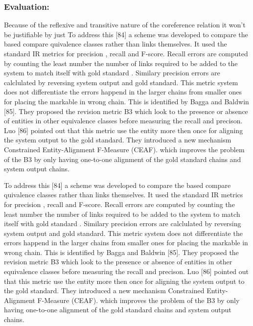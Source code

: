 \documentclass[11pt]{article}
\begin{document}
\subsubsection{Evaluation:}
Because of the reflexive and transitive nature of the coreference relation it won't be justifiable by just
To address this [84] a scheme was developed to compare the  based compare quivalence classes rather than links themselves. It used the standard IR metrics for precision , recall and  F-score. Recall errors are computed by counting the least number the number of links required to be added to the system to match itself with  gold standard . Similary precision errors are calclulated by reversing system output and gold standard. This metric system does not differentiate the errors happend in the larger chains from smaller ones for placing the markable in wrong chain. This is identified by Bagga and Baldwin [85]. They proposed the revision metric B3 which look to the presence or absence of entities in other equivalence classes before measuring the recall and precison.  Luo [86] pointed out that this metric use the entity more then once for aligning the system output to the gold standard. They introduced a new mechanism Constrained Entity-Alignment F-Measure (CEAF). which improves the problem of the B3 by only having one-to-one alignment of the gold standard chains and system output chains.

To address this [84] a scheme was developed to compare the  based compare quivalence classes rather than links themselves. It used the standard IR metrics for precision , recall and  F-score. Recall errors are computed by counting the least number the number of links required to be added to the system to match itself with  gold standard . Similary precision errors are calclulated by reversing system output and gold standard. This metric system does not differentiate the errors happend in the larger chains from smaller ones for placing the markable in wrong chain. This is identified by Bagga and Baldwin [85]. They proposed the revision metric B3 which look to the presence or absence of entities in other equivalence classes before measuring the recall and precison.  Luo [86] pointed out that this metric use the entity more then once for aligning the system output to the gold standard. They introduced a new mechanism Constrained Entity-Alignment F-Measure (CEAF). which improves the problem of the B3 by only having one-to-one alignment of the gold standard chains and system output chains.
\end{document}

